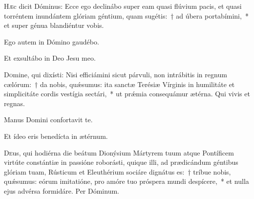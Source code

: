 \documentclass[vesperale_romanum.tex]{subfiles}
\begin{document}
 
\lettrine{H}{æ}c dicit Dóminus: Ecce ego declinábo super eam quasi flúvium pacis, et quasi torréntem inundántem glóriam géntium, quam sugétis:~† ad úbera portabímini,~* et super génua blandiéntur vobis. 

\hymnus

 
 \vv Ego autem in Dómino gaudébo.
 
 \rr Et exsultábo in Deo Jesu meo.

\admagnificat


\oratio

\lettrine{D}{o}mine, qui dixísti: Nisi efficiámini sicut párvuli, non intrábitis in regnum cælórum:~† da nobis, quǽsumus: ita sanctæ Terésiæ Vírginis in humilitáte et simplicitáte cordis vestígia sectári,~* ut prǽmia consequámur ætérna.
Qui vivis et regnas.



\ivesperisrubric

\hymnus


\vv Manus Domini confortavit te.

\rr Et ídeo eris benedícta in ætérnum.

\admagnificat



\myrule



\duplex

\oratio

\lettrine{D}{e}us, qui hodiérna die beátum Dionýsium Mártyrem tuum atque Pontíficem virtúte constántiæ in passióne roborásti, quique illi, ad prædicándum géntibus glóriam tuam, Rústicum et Eleuthérium sociáre dignátus es:~† tríbue nobis, quǽsumus: eórum imitatióne, pro amóre tuo próspera mundi despícere,~* et nulla ejus advérsa formidáre.
Per Dóminum.
\end{document}
